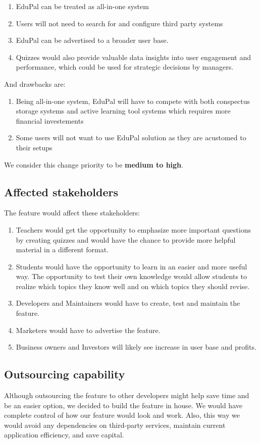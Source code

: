 \documentclass[
    english, %
]{VUMIFPSkursinis}
\begin{document}
\begin{enumerate}
    \item EduPal can be treated as all-in-one system
    \item Users will not need to search for and configure third party systems
    \item EduPal can be advertised to a broader user base.
    \item Quizzes would also provide valuable data insights into user engagement and performance, which could be used for strategic decisions by managers.
\end{enumerate}

And drawbacks are:

\begin{enumerate}
    \item Being all-in-one system, EduPal will have to compete with both conspectus storage systems and active learning tool systems which requires more financial investements
    \item Some users will not want to use EduPal solution as they are acustomed to their setups
\end{enumerate}

We consider this change priority to be \textbf{medium to high}.

\subsection{Affected stakeholders}

The feature would affect these stakeholders:

\begin{enumerate}
    \item Teachers would get the opportunity to emphasize more important questions by creating quizzes and would have the chance to provide more helpful material in a different format.
    \item Students would have the opportunity to learn in an easier and more useful way. The opportunity to test their own knowledge would allow students to realize which topics they know well and on which topics they should revise.
    \item Developers and Maintainers would have to create, test and maintain the feature.
    \item Marketers would have to advertise the feature.
    \item Business owners and Investors will likely see increase in user base and profits.
\end{enumerate}

\subsection{Outsourcing capability}

Although outsourcing the feature to other developers might help save time and be an easier option, we decided to build the feature in house. We would have complete control of how our feature would look and work. Also, this way we would avoid any dependencies on third-party services, maintain current application efficiency, and save capital.

\listoffigures
\printbibliography[heading=bibintoc]
\end{document}
